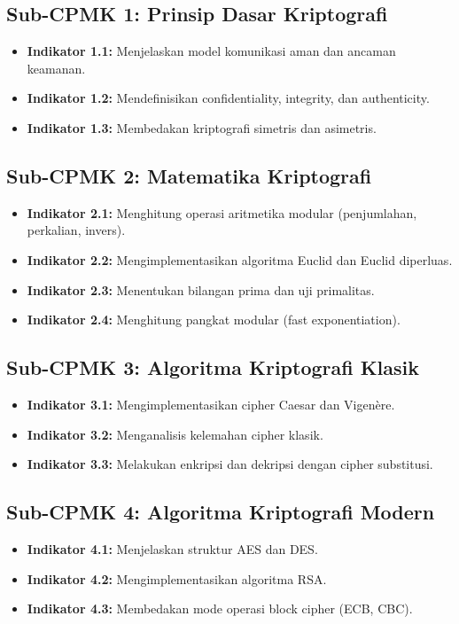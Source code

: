 \documentclass[12pt,a4paper]{article}
\begin{document}
\subsection{Sub-CPMK 1: Prinsip Dasar Kriptografi}
\begin{itemize}
\item \textbf{Indikator 1.1:} Menjelaskan model komunikasi aman dan ancaman keamanan.
\item \textbf{Indikator 1.2:} Mendefinisikan confidentiality, integrity, dan authenticity.
\item \textbf{Indikator 1.3:} Membedakan kriptografi simetris dan asimetris.
\end{itemize}

\subsection{Sub-CPMK 2: Matematika Kriptografi}
\begin{itemize}
\item \textbf{Indikator 2.1:} Menghitung operasi aritmetika modular (penjumlahan, perkalian, invers).
\item \textbf{Indikator 2.2:} Mengimplementasikan algoritma Euclid dan Euclid diperluas.
\item \textbf{Indikator 2.3:} Menentukan bilangan prima dan uji primalitas.
\item \textbf{Indikator 2.4:} Menghitung pangkat modular (fast exponentiation).
\end{itemize}

\subsection{Sub-CPMK 3: Algoritma Kriptografi Klasik}
\begin{itemize}
\item \textbf{Indikator 3.1:} Mengimplementasikan cipher Caesar dan Vigenère.
\item \textbf{Indikator 3.2:} Menganalisis kelemahan cipher klasik.
\item \textbf{Indikator 3.3:} Melakukan enkripsi dan dekripsi dengan cipher substitusi.
\end{itemize}

\subsection{Sub-CPMK 4: Algoritma Kriptografi Modern}
\begin{itemize}
\item \textbf{Indikator 4.1:} Menjelaskan struktur AES dan DES.
\item \textbf{Indikator 4.2:} Mengimplementasikan algoritma RSA.
\item \textbf{Indikator 4.3:} Membedakan mode operasi block cipher (ECB, CBC).
\end{itemize}
\end{document}
